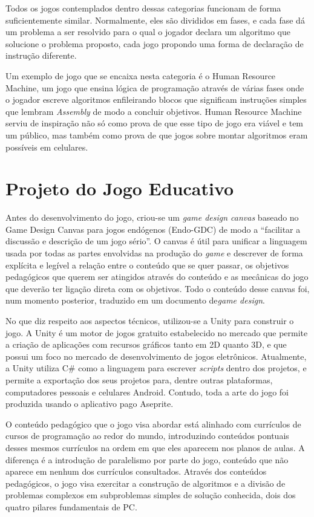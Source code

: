 \documentclass[conference]{IEEEtran}
\begin{document}
Todos os jogos contemplados dentro dessas categorias funcionam de forma suficientemente similar. Normalmente, eles são divididos em fases, e cada fase dá um problema a ser resolvido para o qual o jogador declara um algoritmo que solucione o problema proposto, cada jogo propondo uma forma de declaração de instrução diferente.

Um exemplo de jogo que se encaixa nesta categoria é o Human Resource Machine\cite{b18}, um jogo que ensina lógica de programação através de várias fases onde o jogador escreve algoritmos enfileirando blocos que significam instruções simples que lembram \textit{Assembly} de modo a concluir objetivos. Human Resource Machine serviu de inspiração não só como prova de que esse tipo de jogo era viável e tem um público, mas também como prova de que jogos sobre montar algoritmos eram possíveis em celulares.

\section{Projeto do Jogo Educativo}
Antes do desenvolvimento do jogo, criou-se um \textit{game design canvas} baseado no Game Design Canvas para jogos endógenos (Endo-GDC) de modo a ``facilitar a discussão e descrição de um jogo sério''\cite{b19}. O canvas é útil para unificar a linguagem usada por todas as partes envolvidas na produção do \textit{game} e descrever de forma explícita e legível a relação entre o conteúdo que se quer passar, os objetivos pedagógicos que querem ser atingidos através do conteúdo e as mecânicas do jogo que deverão ter ligação direta com os objetivos. Todo o conteúdo desse canvas foi, num momento posterior, traduzido em um documento de\textit{game design}.

No que diz respeito aos aspectos técnicos, utilizou-se a Unity\cite{b20} para construir o jogo. A Unity é um motor de jogos gratuito estabelecido no mercado que permite a criação de aplicações com recursos gráficos tanto em 2D quanto 3D, e que possui um foco no mercado de desenvolvimento de jogos eletrônicos. Atualmente, a Unity utiliza C\#\cite{b21} como a linguagem para escrever \textit{scripts} dentro dos projetos, e permite a exportação dos seus projetos para, dentre outras plataformas, computadores pessoais e celulares Android. Contudo, toda a arte do jogo foi produzida usando o aplicativo pago Aseprite\cite{b22}.

O conteúdo pedagógico que o jogo visa abordar está alinhado com currículos de cursos de programação ao redor do mundo\cite{b8}\cite{b23}, introduzindo conteúdos pontuais desses mesmos currículos na ordem em que eles aparecem nos planos de aulas. A diferença é a introdução de paralelismo por parte do jogo, conteúdo que não aparece em nenhum dos currículos consultados. Através dos conteúdos pedagógicos, o jogo visa exercitar a construção de algoritmos e a divisão de problemas complexos em subproblemas simples de solução conhecida, dois dos quatro pilares fundamentais de PC\cite{b6}.
\end{document}
